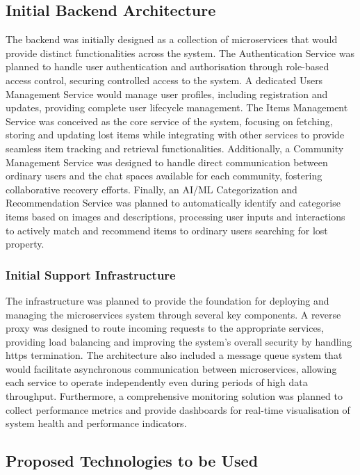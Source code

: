 \subsection{Initial Backend Architecture}

The backend was initially designed as a collection of microservices that would provide distinct functionalities across the system. The Authentication Service was planned to handle user authentication and authorisation through role-based access control, securing controlled access to the system. A dedicated Users Management Service would manage user profiles, including registration and updates, providing complete user lifecycle management. The Items Management Service was conceived as the core service of the system, focusing on fetching, storing and updating lost items while integrating with other services to provide seamless item tracking and retrieval functionalities. Additionally, a Community Management Service was designed to handle direct communication between ordinary users and the chat spaces available for each community, fostering collaborative recovery efforts. Finally, an AI/ML Categorization and Recommendation Service was planned to automatically identify and categorise items based on images and descriptions, processing user inputs and interactions to actively match and recommend items to ordinary users searching for lost property.

\subsubsection{Initial Support Infrastructure}

The infrastructure was planned to provide the foundation for deploying and managing the microservices system through several key components. A reverse proxy was designed to route incoming requests to the appropriate services, providing load balancing and improving the system's overall security by handling \ac{https} termination. The architecture also included a message queue system that would facilitate asynchronous communication between microservices, allowing each service to operate independently even during periods of high data throughput. Furthermore, a comprehensive monitoring solution was planned to collect performance metrics and provide dashboards for real-time visualisation of system health and performance indicators.


\subsection{Proposed Technologies to be Used}

